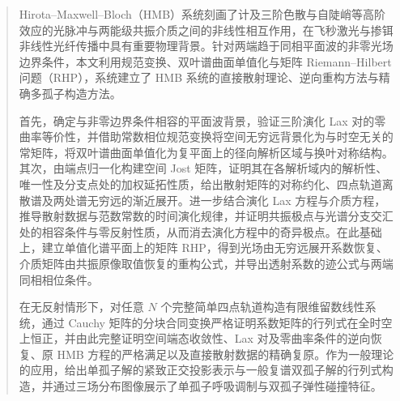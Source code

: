 
\begin{abstract}
Hirota--Maxwell--Bloch（HMB）系统刻画了计及三阶色散与自陡峭等高阶效应的光脉冲与两能级共振介质之间的非线性相互作用，在飞秒激光与掺铒非线性光纤传播中具有重要物理背景。针对两端趋于同相平面波的非零光场边界条件，本文利用规范变换、双叶谱曲面单值化与矩阵 Riemann--Hilbert 问题（RHP），系统建立了 HMB 系统的直接散射理论、逆向重构方法与精确多孤子构造方法。

首先，确定与非零边界条件相容的平面波背景，验证三阶演化 Lax 对的零曲率等价性，并借助常数相位规范变换将空间无穷远背景化为与时空无关的常矩阵，将双叶谱曲面单值化为复平面上的径向解析区域与换叶对称结构。其次，由端点归一化构建空间 Jost 矩阵，证明其在各解析域内的解析性、唯一性及分支点处的加权延拓性质，给出散射矩阵的对称约化、四点轨道离散谱及两处谱无穷远的渐近展开。进一步结合演化 Lax 方程与介质方程，推导散射数据与范数常数的时间演化规律，并证明共振极点与光谱分支交汇处的相容条件与零反射性质，从而消去演化方程中的奇异极点。在此基础上，建立单值化谱平面上的矩阵 RHP，得到光场由无穷远展开系数恢复、介质矩阵由共振原像取值恢复的重构公式，并导出透射系数的迹公式与两端同相相位条件。

在无反射情形下，对任意 $N$ 个完整简单四点轨道构造有限维留数线性系统，通过 Cauchy 矩阵的分块合同变换严格证明系数矩阵的行列式在全时空上恒正，并由此完整证明空间端态收敛性、Lax 对及零曲率条件的逆向恢复、原 HMB 方程的严格满足以及直接散射数据的精确复原。作为一般理论的应用，给出单孤子解的紧致正交投影表示与一般复谱双孤子解的行列式构造，并通过三场分布图像展示了单孤子呼吸调制与双孤子弹性碰撞特征。
\end{abstract}

